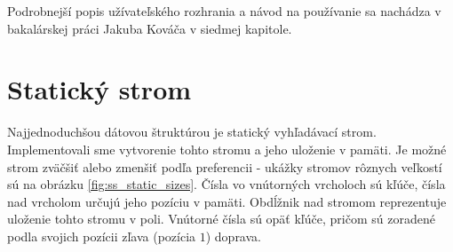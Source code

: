 Podrobnejší popis užívateľského rozhrania a návod na používanie sa nachádza v bakalárskej práci Jakuba Kováča \citep{algviskuko} v siedmej kapitole.

\section{Statický strom}
Najjednoduchšou dátovou štruktúrou je statický vyhľadávací strom. Implementovali sme vytvorenie tohto stromu a jeho uloženie v pamäti. Je možné strom zväčšiť alebo zmenšiť podľa preferencii - ukážky stromov rôznych veľkostí sú na obrázku \ref{fig:ss_static_sizes}. Čísla vo vnútorných vrcholoch sú kľúče, čísla nad vrcholom určujú jeho pozíciu v pamäti. Obdĺžnik nad stromom reprezentuje uloženie tohto stromu v poli. Vnútorné čísla sú opäť kľúče, pričom sú zoradené podla svojich pozícii zľava (pozícia $1$) doprava.

